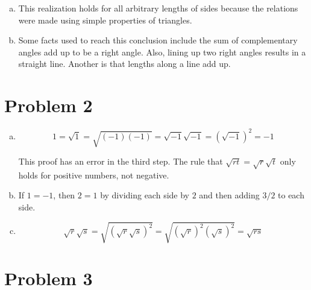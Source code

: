 \documentclass{article}
\begin{document}
\begin{enumerate}[a.]
  \item This realization holds for all arbitrary lengths of sides because the
    relations were made using simple properties of triangles.

  \item Some facts used to reach this conclusion include the sum of
    complementary angles add up to be a right angle. Also, lining up two right
    angles results in a straight line. Another is that lengths along a line add
    up.

\end{enumerate}

\section*{Problem 2}

\begin{enumerate}[a.]
  \item $$ 1 = \sqrt{1} = \sqrt{(-1)(-1)} = \sqrt{-1} \sqrt{-1} = \left(
    \sqrt{-1} \right)^{2} = -1 $$

    This proof has an error in the third step. The rule that $ \sqrt{rt} =
    \sqrt{r}\sqrt{t}$ only holds for positive numbers, not negative.

  \item If $1 = -1$, then $2 = 1$ by dividing each side by $2$ and then adding
    $3/2$ to each side.

  \item
    $$ \sqrt{r}\sqrt{s} = \sqrt{\left( \sqrt{r} \sqrt{s} \right)^{2}} =
    \sqrt{\left( \sqrt{r} \right)^{2} \left( \sqrt{s} \right)^{2}} = \sqrt{rs}
    $$

\end{enumerate}

\section*{Problem 3}
\end{document}
